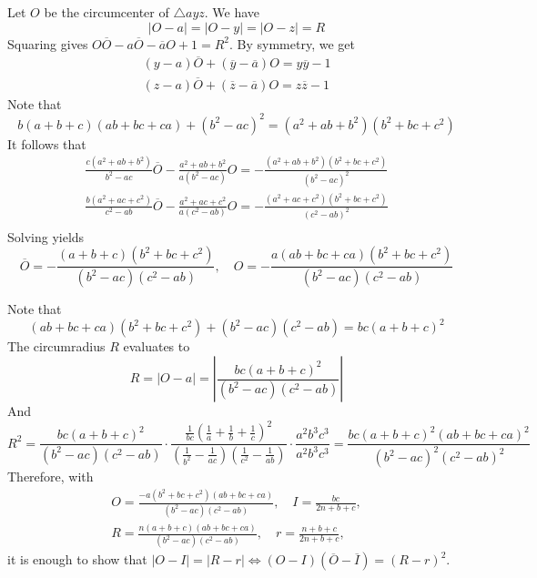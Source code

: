 \begin{enumerate}
 Let $O$ be the circumcenter of $\triangle ayz$. We have
 \[\lvert O-a\rvert=\lvert O-y\rvert=\lvert O-z\rvert=R\]Squaring gives $O\overline{O}-a\overline{O}-\overline{a}O+1=R^2$. By symmetry, we get\begin{align*}(y-a)\overline{O}+(\overline{y}-\overline{a})O=y\overline{y}-1\\(z-a)\overline{O}+(\overline{z}-\overline{a})O=z\overline{z}-1\end{align*}
Note that
 \[b(a+b+c)(ab+bc+ca)+(b^2-ac)^2=(a^2+ab+b^2)(b^2+bc+c^2)\]It follows that\begin{align*}\frac{c(a^2+ab+b^2)}{b^2-ac}\overline{O}-\frac{a^2+ab+b^2}{a(b^2-ac)}O=-\frac{(a^2+ab+b^2)(b^2+bc+c^2)}{(b^2-ac)^2}\\\frac{b(a^2+ac+c^2)}{c^2-ab}\overline{O}-\frac{a^2+ac+c^2}{a(c^2-ab)}O=-\frac{(a^2+ac+c^2)(b^2+bc+c^2)}{(c^2-ab)^2}\\\end{align*}
Solving yields
 \[\overline{O}=-\frac{(a+b+c)(b^2+bc+c^2)}{(b^2-ac)(c^2-ab)},\quad O=-\frac{a(ab+bc+ca)(b^2+bc+c^2)}{(b^2-ac)(c^2-ab)}\]

 Note that 
 \[(ab+bc+ca)(b^2+bc+c^2)+(b^2-ac)(c^2-ab)=bc(a+b+c)^2\]The circumradius $R$ evaluates to
 \[R=\lvert O-a\rvert=\left\lvert \frac{bc(a+b+c)^2}{(b^2-ac)(c^2-ab)}\right\rvert\]And
 \[R^2=\frac{bc(a+b+c)^2}{(b^2-ac)(c^2-ab)}\cdot\frac{\frac{1}{bc}(\frac{1}{a}+\frac{1}{b}+\frac{1}{c})^2}{\left(\frac{1}{b^2}-\frac{1}{ac}\right)\left(\frac{1}{c^2}-\frac{1}{ab}\right)}\cdot\frac{a^2b^3c^3}{a^2b^3c^3}=\frac{bc(a+b+c)^2(ab+bc+ca)^2}{(b^2-ac)^2(c^2-ab)^2}\]Therefore, with\begin{gather*}O=\frac{-a(b^2+bc+c^2)(ab+bc+ca)}{(b^2-ac)(c^2-ab)},\quad I=\frac{bc}{2n+b+c},\\R=\frac{n(a+b+c)(ab+bc+ca)}{(b^2-ac)(c^2-ab)},\quad r=\frac{n+b+c}{2n+b+c},\end{gather*}it is enough to show that $\lvert O-I\rvert = \lvert R-r\rvert\iff (O-I)(\overline{O}-\overline{I})=(R-r)^2$.


\end{enumerate}
